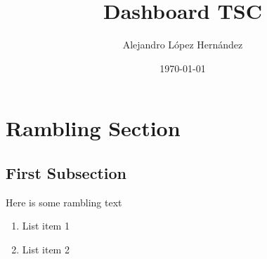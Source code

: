 \documentclass[xcolor=dvipsnames]{beamer}
\title{Dashboard TSC}
\date{\today}
\author{Alejandro López Hernández}
\institute[UNAM]{\texttt{[image: UNAM]} \\Universidad Nacional Autonoma de México \\ FES Acatlán}
\begin{document}
	
	\begin{frame}
		\titlepage
	\end{frame}
	
	\begin{frame}
		\tableofcontents
	\end{frame}
	
	\section{Rambling Section}
	
	\subsection{First Subsection}
	
	\begin{frame}
		Here is some rambling text
		\begin{enumerate}
			\item List item 1
			\item List item 2
		\end{enumerate}
	\end{frame}
\end{document}
